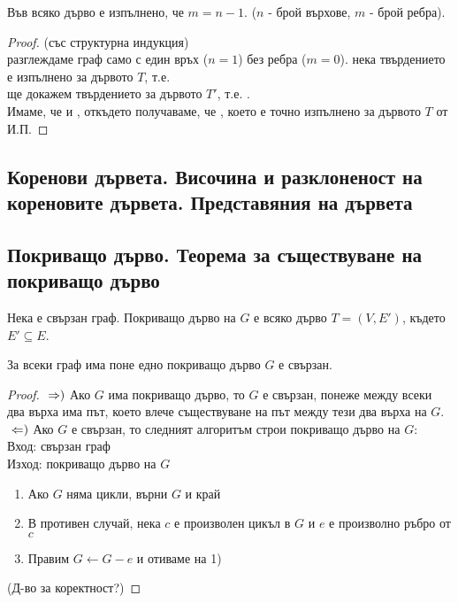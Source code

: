 \begin{theorem}
    Във всяко дърво е изпълнено, че \(m = n - 1\). (\(n\) - брой върхове, \(m\) - брой ребра).
\end{theorem}
\begin{proof}
    (със структурна индукция) \\
     разглеждаме граф само с един връх (\(n = 1\)) без ребра (\(m = 0\)).
     нека твърдението е изпълнено за дървото \(T\), т.е. 
     \\
     ще докажем твърдението за дървото \(T'\), т.е. . \\
    Имаме, че  и , откъдето получаваме, че 
    , което е точно изпълнено за дървото \(T\)
    от И.П.
\end{proof}

\subsection*{Коренови дървета. Височина и разклоненост на кореновите дървета. Представяния на дървета}



\subsection*{Покриващо дърво. Теорема за съществуване на покриващо дърво}
\begin{definition}
    Нека \graf е свързан граф. Покриващо дърво на \(G\) е всяко дърво \(T = (V, E')\), където \(E' \subseteq E\).
\end{definition}

\begin{theorem}
    За всеки граф \graf има поне едно покриващо дърво \totw \(G\) е свързан.
\end{theorem}
\begin{proof}
    \(\newline\Rightarrow)\) Ако \(G\) има покриващо дърво, то \(G\) е свързан, понеже между всеки два 
    върха има път, което влече съществуване на път между тези два върха на \(G\).
    \(\newline\Leftarrow)\) Ако \(G\) е свързан, то следният алгоритъм строи покриващо дърво на \(G\): \\
    Вход: свързан граф  \\
    Изход: покриващо дърво на \(G\)
    \begin{enumerate}
        \item Ако \(G\) няма цикли, върни \(G\) и край
        \item В противен случай, нека \(c\) е произволен цикъл в \(G\) и \(e\) е произволно ръбро от \(c\)
        \item Правим \(G \leftarrow G - e\) и отиваме на 1) 
    \end{enumerate}
    (Д-во за коректност?)
\end{proof}